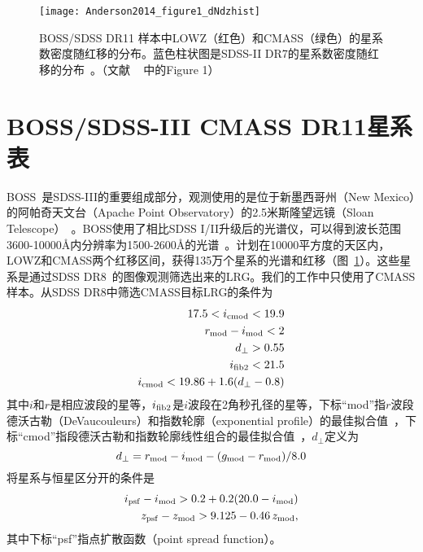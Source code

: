 \begin{figure}
\centering
\texttt{[image: Anderson2014\_figure1\_dNdzhist]}
\caption{BOSS/SDSS DR11 样本中LOWZ（红色）和CMASS（绿色）的星系数密度随红移的分布。蓝色柱状图是SDSS-II DR7的星系数密度随红移的分布~\cite{Abazajian2009DR7}。（文献 ~ 中的Figure 1）}
\label{fig:AndersonFig1}
\end{figure}

\section{BOSS/SDSS-III CMASS DR11星系表}

BOSS~\cite{Eisenstein:2011sa, Bolton:2012hz, Dawson2013}是SDSS-III的重要组成部分，观测使用的是位于新墨西哥州（New Mexico）的阿帕奇天文台（Apache Point Observatory）的2.5米斯隆望远镜（Sloan Telescope）~\cite{Gunn2006}。BOSS使用了相比SDSS I/II升级后的光谱仪，可以得到波长范围3600-10000\r{A}内分辨率为1500-2600\r{A}的光谱~\cite{Smee2013}。计划在10000平方度的天区内，LOWZ和CMASS两个红移区间，获得135万个星系的光谱和红移（图~\ref{fig:AndersonFig1}）。这些星系是通过SDSS DR8~\cite{Aihara2011}的图像观测筛选出来的LRG。我们的工作中只使用了CMASS样本。从SDSS DR8中筛选CMASS目标LRG的条件为
\begin{eqnarray}
 17.5 < i_{\rm cmod}  < 19.9\\
r_{\rm mod} - i_{\rm mod}  < 2 \\
d_{\perp} > 0.55 \label{eq:hcut}\\
i_{\rm fib2} < 21.5\\
i_{\rm cmod}  < 19.86 + 1.6(d_{\perp} - 0.8) \label{eq:slide}
\end{eqnarray}
其中$i$和$r$是相应波段的星等，$i_{\rm fib2}$是$i$波段在2角秒孔径的星等，下标“mod”指$r$波段德沃古勒（DeVaucouleurs）和指数轮廓（exponential profile）的最佳拟合值~\cite{Stoughton2002}，下标“cmod”指段德沃古勒和指数轮廓线性组合的最佳拟合值~\cite{Abazajian2004}，$d_{\perp}$定义为
\begin{equation}
d_{\perp} = r_{\rm mod} - i_{\rm mod} - (g_{\rm mod} - r_{\rm mod})/8.0
\label{eq:dp}
\end{equation}
将星系与恒星区分开的条件是
\begin{eqnarray}
i_{\rm psf} - i_{\rm mod} > 0.2 + 0.2(20.0-i_{\rm mod})  \label{eq:sgsep1}\\
z_{\rm psf}-z_{\rm mod} > 9.125 -0.46\,z_{\rm mod} \label{eq:sgsep2},
\end{eqnarray}
其中下标“psf”指点扩散函数（point spread function）。

